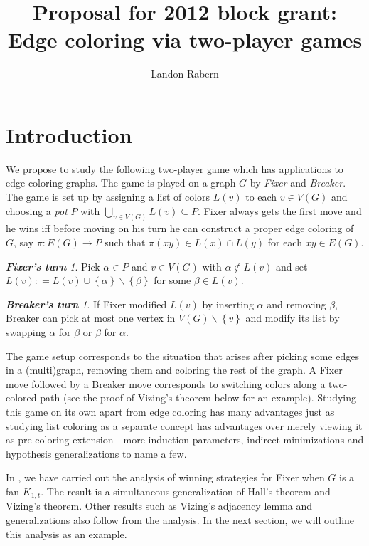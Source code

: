 \documentclass[12pt]{amsart}
\title{Proposal for 2012 block grant:\\Edge coloring via two-player games}
\author{Landon Rabern}
\theoremstyle{plain}
\theoremstyle{definition}
\theoremstyle{remark}
\newtheorem*{FixerMove}{\bf {Fixer's turn}}
\newtheorem*{BreakerMove}{\bf {Breaker's turn}}
\newcommand{\set}[1]{\left\{ #1 \right\}}
\newcommand{\func}[3]{#1\colon #2 \rightarrow #3}
\newcommand{\DefinedAs}{\mathrel{\mathop:}=}
\begin{document}
\maketitle

\section{Introduction}
We propose to study the following two-player game which has applications to edge
coloring graphs.  The game is played on a graph $G$ by \emph{Fixer} and
\emph{Breaker}.  The game is set up by assigning a list of colors $L(v)$ to each
$v \in V(G)$ and choosing a \emph{pot} $P$ with $\bigcup_{v \in V(G)} L(v)
\subseteq P$.  Fixer always gets the first move and he wins iff before moving on
his turn he can construct a proper edge coloring of $G$, say $\func{\pi}{E(G)}{P}$ such that
$\pi(xy) \in L(x) \cap L(y)$ for each $xy \in E(G)$.

\begin{FixerMove}
Pick $\alpha \in P$ and $v \in V(G)$ with $\alpha \not \in L(v)$ and set $L(v)
\DefinedAs L(v) \cup \set{\alpha} \smallsetminus \set{\beta}$ for some $\beta
\in L(v)$.
\end{FixerMove}

\begin{BreakerMove}
If Fixer modified $L(v)$ by inserting $\alpha$ and removing $\beta$, Breaker can
pick at most one vertex in $V(G) \smallsetminus \set{v}$ and modify its list by
swapping $\alpha$ for $\beta$ or $\beta$ for $\alpha$.
\end{BreakerMove}

The game setup corresponds to the situation that arises after picking some edges
in a (multi)graph, removing them and coloring the rest of the graph.  A Fixer
move followed by a Breaker move corresponds to switching colors along a
two-colored path (see the proof of Vizing's theorem below for an example). 
Studying this game on its own apart from edge coloring has many advantages just as studying list coloring as a separate concept has advantages
over merely viewing it as pre-coloring extension---more induction parameters,
indirect minimizations and hypothesis generalizations to name a few.

In \cite{HallGame}, we have carried out the analysis of winning strategies for
Fixer when $G$ is a fan $K_{1,t}$.  The result is a simultaneous generalization
of Hall's theorem and Vizing's theorem.  Other results such as Vizing's
adjacency lemma and generalizations also follow from the analysis.  In the
next section, we will outline this analysis as an example.  
\end{document}
